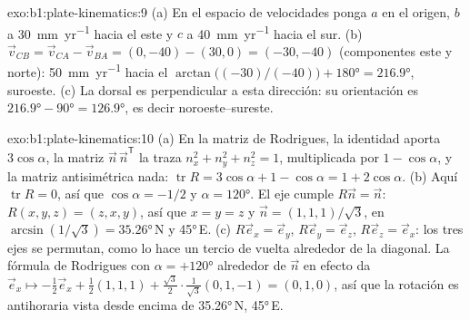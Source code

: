 \begin{solution}{exo:b1:plate-kinematics:9}
(a) En el espacio de velocidades ponga $a$ en el origen, $b$ a \qty{30}{mm.yr^{-1}} hacia
el este y $c$ a \qty{40}{mm.yr^{-1}} hacia el sur. (b) $\vec v_{CB} =
\vec v_{CA} - \vec v_{BA} = (0, -40) - (30, 0) = (-30, -40)$ (componentes este y norte):
\qty{50}{mm.yr^{-1}} hacia el 
$\arctan\bigl((-30)/(-40)\bigr) + \ang{180} = \ang{216.9}$, suroeste. (c) La
dorsal es perpendicular a esta dirección: su orientación es
$\ang{216.9} - \ang{90} = \ang{126.9}$, es decir noroeste--sureste.
\end{solution}

\begin{solution}{exo:b1:plate-kinematics:10}
(a) En la matriz de Rodrigues, la identidad aporta $3\cos\alpha$, la matriz
$\vec n\,\vec n^{\mathsf T}$ la traza $n_x^2 + n_y^2 + n_z^2 = 1$, multiplicada por
$1 - \cos\alpha$, y la matriz antisimétrica nada: $\operatorname{tr}R =
3\cos\alpha + 1 - \cos\alpha = 1 + 2\cos\alpha$. (b) Aquí $\operatorname{tr}R = 0$,
así que $\cos\alpha = -1/2$ y $\alpha = \ang{120}$. El eje cumple $R\vec n =
\vec n$: $R(x, y, z) = (z, x, y)$, así que $x = y = z$ y $\vec n =
(1, 1, 1)/\sqrt3$, en  $\arcsin(1/\sqrt3) = \ang{35.26}$\,N y
 \ang{45}\,E. (c) $R\vec e_x = \vec e_y$, $R\vec e_y = \vec e_z$,
$R\vec e_z = \vec e_x$: los tres ejes se permutan, como lo hace un tercio de vuelta alrededor de la diagonal. La fórmula de Rodrigues con $\alpha = +\ang{120}$ alrededor de $\vec n$
en efecto da $\vec e_x\mapsto -\tfrac12\vec e_x + \tfrac12(1, 1, 1) +
\tfrac{\sqrt3}{2}\cdot\tfrac{1}{\sqrt3}(0, 1, -1) = (0, 1, 0)$, así que la rotación
es antihoraria vista desde encima de \ang{35.26}\,N, \ang{45}\,E.
\end{solution}

